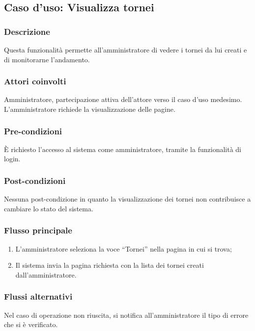 %
%
\subsection{Caso d'uso: Visualizza tornei}
\label{uc-visualizza-tornei}

\subsubsection*{Descrizione}
Questa funzionalità permette all'amministratore di vedere i tornei da lui creati e di monitorarne l'andamento.

\subsubsection*{Attori coinvolti}
Amministratore, partecipazione attiva dell'attore verso il caso d'uso medesimo.
L'amministratore richiede la visualizzazione delle pagine.

\subsubsection*{Pre-condizioni}
È richiesto l'accesso al sistema come amministratore, tramite la funzionalità di login.

\subsubsection*{Post-condizioni}
Nessuna post-condizione in quanto la visualizzazione dei tornei non contribuisce a cambiare lo stato del sistema.

\subsubsection*{Flusso principale}

\begin{enumerate}
	
	\item
	L'amministratore seleziona la voce ``Tornei'' nella pagina in cui si trova;
	
	\item
	Il sistema invia la pagina richiesta con la lista dei tornei creati dall'amministratore.
	
\end{enumerate}

\subsubsection*{Flussi alternativi}
Nel caso di operazione non riuscita, si notifica all'amministratore il tipo di errore che si è verificato.


